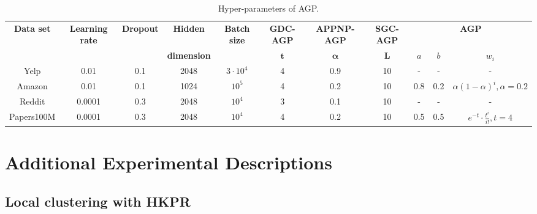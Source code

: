 \begin{table*}[t]
	\tblcapup
	\caption{Hyper-parameters of AGP.}
	\vspace{-5mm}
	\tblcapdown
	\begin{small}
	\begin{threeparttable}
		\begin{tabular}{|c|c|c|c|c|c|c|c|c|c|c|}
			\hline
			\multirow{2}{*}{{\bf Data set}} & \multirow{2}{*}{\bf Learning rate}& \multirow{2}{*}{{\bf Dropout}} & {\bf Hidden} &\multirow{2}{*}{\bf Batch size} & {\bf GDC-AGP}&{\bf APPNP-AGP}&\bf SGC-AGP &\multicolumn{3}{c|}{\bf AGP} \\ \cline{6-11}
			~&&&{\bf dimension} & &$\boldsymbol{t}$& $\boldsymbol{\alpha}$& $\boldsymbol{L}$& {\bf $a$} &{\bf $b$}& {\bf $w_i$} \\ \hline
Yelp & 0.01 & 0.1 & 2048 & $3\cdot 10^4$&  4 & 0.9& 10 & - & - & -\\
Amazon  & 0.01 & 0.1 & 1024 &$10^5$& 4 & 0.2& 10 & 0.8 & 0.2 & $\alpha(1-\alpha)^i, \alpha=0.2$\\
Reddit  & 0.0001 & 0.3 &  2048  &$10^4$& 3 & 0.1& 10 & - & -& -\\
Papers100M & 0.0001 & 0.3 & 2048 &$10^4$& 4 & 0.2& 10 & 0.5 & 0.5 & $e^{-t}\cdot \frac{t^i}{i!}, t=4$\\ 
			\hline
		\end{tabular}
	\end{threeparttable}
	\end{small}
	\label{tbl:parameters}
	\vspace{-1mm}
\end{table*}

\section{Additional Experimental Descriptions}\label{sec:appendix}

\subsection{Local clustering with HKPR}


